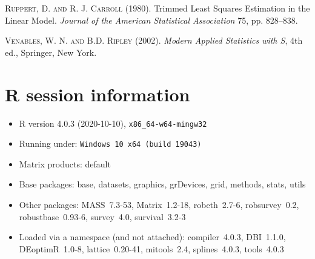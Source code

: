 \documentclass[a4paper,oneside,11pt,DIV=12]{scrartcl}
\begin{document}
\begin{thebibliography}{14}
    \textsc{Ruppert, D. and R. J. Carroll} (1980).
    Trimmed Least Squares Estimation in the Linear Model.
    \emph{Journal of the American Statistical Association} 75,
    pp. 828--838.

    \textsc{Venables, W. N. and B.D. Ripley} (2002).
    \emph{Modern Applied Statistics with S},
    4th ed., Springer, New York.
\end{thebibliography}

\appendix

\section{R session information}
\begin{itemize}\raggedright
  \item R version 4.0.3 (2020-10-10), \verb|x86_64-w64-mingw32|
  \item Running under: \verb|Windows 10 x64 (build 19043)|
  \item Matrix products: default
  \item Base packages: base, datasets, graphics, grDevices, grid,
    methods, stats, utils
  \item Other packages: MASS~7.3-53, Matrix~1.2-18, robeth~2.7-6,
    robsurvey~0.2, robustbase~0.93-6, survey~4.0, survival~3.2-3
  \item Loaded via a namespace (and not attached): compiler~4.0.3,
    DBI~1.1.0, DEoptimR~1.0-8, lattice~0.20-41, mitools~2.4,
    splines~4.0.3, tools~4.0.3
\end{itemize}
\end{document}
